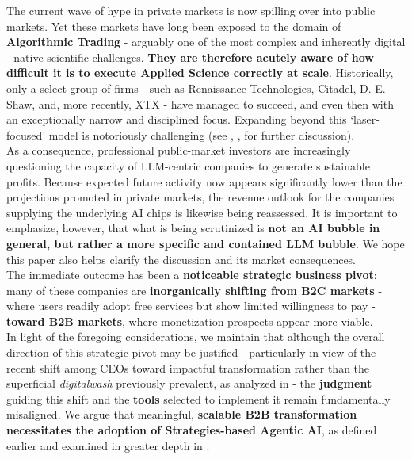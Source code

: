 \documentclass{article}
\begin{document}
The current wave of hype in private markets is now spilling over into public markets. Yet these markets have long been exposed to the domain of \textbf{Algorithmic Trading} - arguably one of the most complex and inherently digital - native scientific challenges. \textbf{They are therefore acutely aware of how difficult it is to execute Applied Science correctly at scale}. Historically, only a select group of firms - such as Renaissance Technologies, Citadel, D. E. Shaw, and, more recently, XTX - have managed to succeed, and even then with an exceptionally narrow and disciplined focus. Expanding beyond this ‘laser-focused’ model is notoriously challenging (see \cite{book}, \cite{Inside the blackbox}, \cite{Advances in ML} for further discussion).\\

As a consequence, professional public-market investors are increasingly questioning the capacity of LLM-centric companies to generate sustainable profits. Because expected future activity now appears significantly lower than the projections promoted in private markets, the revenue outlook for the companies supplying the underlying AI chips is likewise being reassessed. It is important to emphasize, however, that what is being scrutinized is \textbf{not an AI bubble in general, but rather a more specific and contained LLM bubble}. We hope this paper also helps clarify the discussion and its market consequences.\\

The immediate outcome has been a \textbf{noticeable strategic business pivot}: many of these companies are \textbf{inorganically shifting from B2C markets} - where users readily adopt free services but show limited willingness to pay - \textbf{toward B2B markets}, where monetization prospects appear more viable.\\

In light of the foregoing considerations, we maintain that although the overall direction of this strategic pivot may be justified - particularly in view of the recent shift among CEOs toward impactful transformation rather than the superficial \textit{digitalwash} previously prevalent, as analyzed in \cite{Digital Washing} - the \textbf{judgment} guiding this shift and the \textbf{tools} selected to implement it remain fundamentally misaligned. We argue that meaningful, \textbf{scalable B2B transformation necessitates the adoption of Strategies-based Agentic AI}, as defined earlier and examined in greater depth in \cite{Data MAPs}.\\
\end{document}

